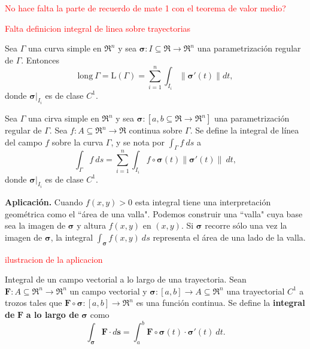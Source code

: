 \textcolor{red}{No hace falta la parte de recuerdo de mate 1 con el teorema de valor medio?}

\textcolor{red}{Falta definicion integral de linea sobre trayectorias}

\begin{definition}
    Sea $\Gamma$ una curva simple en $\Re^n$ y sea $\boldsymbol{\sigma}:I\subseteq\Re\to\Re^n$ una parametrizaci\'on regular de $\Gamma$. Entonces
    \[
        \text{long}\:\Gamma=\text{L}(\Gamma)=\sum_{i=1}^{n}\int_{I_i}\|\boldsymbol{\sigma}'(t)\|dt,    
    \]
    donde $\boldsymbol{\sigma}\lvert_{I_i}$ es de clase $C^1$.
\end{definition}

\begin{definition}
    Sea $\Gamma$ una cirva simple en $\Re^n$ y sea $\boldsymbol{\sigma}:[a,b\subseteq\Re\to\Re^n]$ una parametrizaci\'on regular de $\Gamma$. Sea $f:A\subseteq\Re^n\to\Re$ continua sobre $\Gamma$. Se define la integral de l\'inea del campo $f$ sobre la curva $\Gamma$, y se nota por $\int_{\Gamma}f\:ds$ a
    \[
        \int_{\Gamma}f\:ds=\sum_{i=1}^{n}\int_{I_i}f\circ\boldsymbol{\sigma}(t)\|\boldsymbol{\sigma}'(t)\|\:dt,  
    \]
    donde $\boldsymbol{\sigma}\lvert_{I_i}$ es de clase $C^1$.
\end{definition}

\textbf{Aplicaci\'on.}
Cuando $f(x,y)>0$ esta integral tiene una interpretaci\'on geom\'etrica como el ``\'area de una valla". Podemos construir una ``valla" cuya base sea la imagen de $\boldsymbol{\sigma}$ y altura $f(x,y)$ en $(x,y)$. Si $\boldsymbol{\sigma}$ recorre s\'olo una vez la imagen de $\boldsymbol{\sigma}$, la integral $\int_{\boldsymbol{\sigma}}f(x,y)\:ds$ representa el \'area de una lado de la valla.

\textcolor{red}{ilustracion de la aplicacion}

\begin{definition}
    Integral de un campo vectorial a lo largo de una trayectoria.
    Sean $\mathbf{F}:A\subseteq\Re^n\to\Re^n$ un campo vectorial y $\boldsymbol{\sigma}:[a,b]\to A\subseteq\Re^n$ una trayectorial $C^1$ a trozos tales que $\mathbf{F}\circ\boldsymbol{\sigma}:[a,b]\to\Re^n$ es una funci\'on continua. Se define la \textbf{integral de} $\mathbf{F}$ \textbf{a lo largo de} $\boldsymbol{\sigma}$ como
    \[
        \int_{\boldsymbol{\sigma}}\mathbf{F}\cdot d\mathbf{s}=\int_a^b\mathbf{F}\circ\boldsymbol{\sigma}(t)\cdot\boldsymbol{\sigma}'(t)\:dt.  
    \]
\end{definition}

